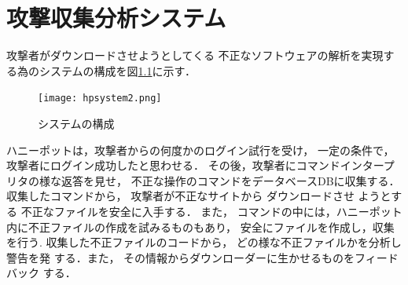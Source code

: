 \documentclass[dvipdfmx]{bta}
\begin{document}
\chapter{攻撃収集分析システム}


攻撃者がダウンロードさせようとしてくる
不正なソフトウェアの解析を実現する為のシステムの構成を図\ref{fig:system}に示す．

\begin{figure}[htbp]
	\centering
 	\texttt{[image: hpsystem2.png]}
 	\caption{システムの構成}\label{fig:system}
\end{figure}






ハニーポットは，攻撃者からの何度かのログイン試行を受け，
一定の条件で，攻撃者にログイン成功したと思わせる．
その後，攻撃者にコマンドインタープリタの様な返答を見せ，
不正な操作のコマンドをデータベースDBに収集する．
% 
収集したコマンドから，
攻撃者が不正なサイトから
ダウンロードさせ
ようとする
不正なファイルを安全に入手する．
また，
コマンドの中には，ハニーポット内に不正ファイルの作成を試みるものもあり，
安全にファイルを作成し，収集を行う.
% 
収集した不正ファイルのコードから，
どの様な不正ファイルかを分析し警告を発
する．また，
その情報からダウンローダーに生かせるものをフィードバック
する．
% 

\end{document}
